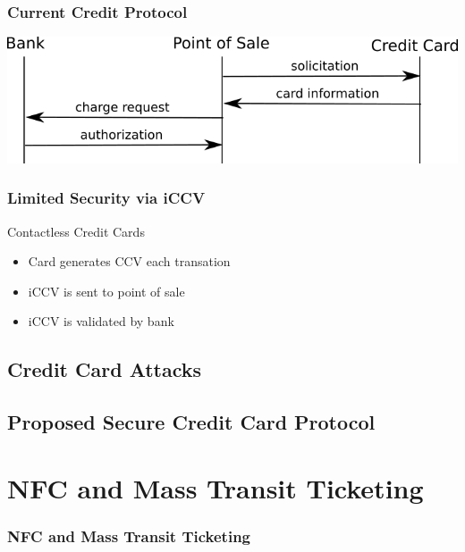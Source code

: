 \documentclass[unknownkeysallowed]{beamer}
\begin{document}
\begin{frame}
\frametitle{Current Credit Protocol}
  \begin{center}
  \includegraphics[scale=.5]{../TomPaper/figures/CCcurrent.png}
  \end{center}
\end{frame}

\begin{frame}
\frametitle{Limited Security via iCCV}
  \begin{center}
  \begin{minipage}{.9\textwidth}
  \begin{block}{Contactless Credit Cards}
    \begin{itemize}
      \item{Card generates CCV each transation}
      \item{iCCV is sent to point of sale}
      \item{iCCV is validated by bank}
    \end{itemize}
  \end{block}
  \end{minipage}
  \end{center}
\end{frame}


\subsection{Credit Card Attacks}
\subsection{Proposed Secure Credit Card Protocol}

\section{NFC and Mass Transit Ticketing}
\begin{frame}
\frametitle{NFC and Mass Transit Ticketing}
\begin{center}\begin{minipage}{.9\textwidth}
\tableofcontents[currentsubsection, hideothersubsections, sectionstyle=show/shaded]
\end{minipage}\end{center}
\end{frame}
%
\end{document}
